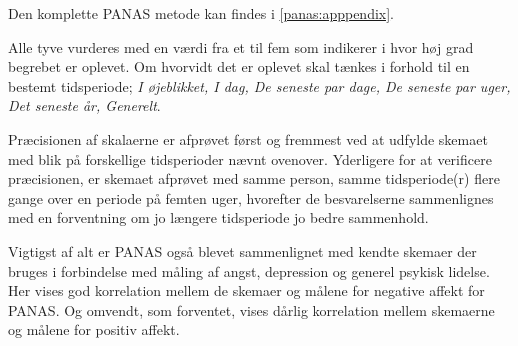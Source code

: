 Den komplette PANAS metode kan findes i \cref{panas:apppendix}.

Alle tyve vurderes med en værdi fra et til fem som indikerer i hvor høj grad begrebet er oplevet.
Om hvorvidt det er oplevet skal tænkes i forhold til en bestemt tidsperiode; \textit{I øjeblikket, I dag, De seneste par dage, De seneste par uger, Det seneste år, Generelt}.

Præcisionen af skalaerne er afprøvet først og fremmest ved at udfylde skemaet med blik på forskellige tidsperioder nævnt ovenover.
Yderligere for at verificere præcisionen, er skemaet afprøvet med samme person, samme tidsperiode(r) flere gange over en periode på femten uger, hvorefter de besvarelserne sammenlignes med en forventning om jo længere tidsperiode jo bedre sammenhold.

Vigtigst af alt er PANAS også blevet sammenlignet med kendte skemaer der bruges i forbindelse med måling af angst, depression og generel psykisk lidelse.
Her vises god korrelation mellem de skemaer og målene for negative affekt for PANAS.
Og omvendt, som forventet, vises dårlig korrelation mellem skemaerne og målene for positiv affekt.